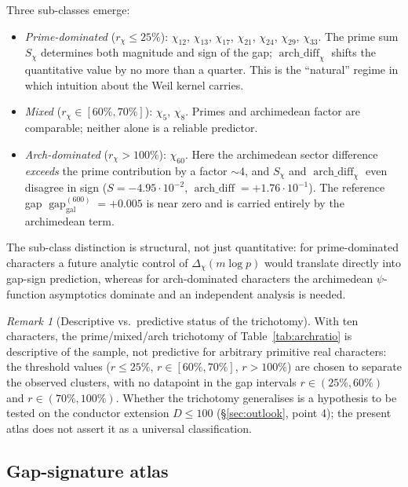 \documentclass[10pt,twocolumn]{article}
\theoremstyle{definition}
\theoremstyle{remark}
\newtheorem{remark}[theorem]{Remark}
\newcommand{\gap}{\operatorname{gap}}
\newcommand{\chifn}{\chi}
\newcommand{\Deltachi}{\Delta_{\chifn}}
\newcommand{\archdiff}{\operatorname{arch\_diff}}
\begin{document}
Three sub-classes emerge:
\begin{itemize}
  \item \emph{Prime-dominated} ($r_{\chifn}\leq 25\%$):
    $\chifn_{12}$, $\chifn_{13}$, $\chifn_{17}$, $\chifn_{21}$,
    $\chifn_{24}$, $\chifn_{29}$, $\chifn_{33}$. The prime sum
    $S_{\chifn}$ determines both magnitude and sign of the gap;
    $\archdiff_{\chifn}$ shifts the quantitative value by no more
    than a quarter. This is the ``natural'' regime in which
    intuition about the Weil kernel carries.
  \item \emph{Mixed} ($r_{\chifn}\in[60\%,70\%]$):
    $\chifn_5$, $\chifn_8$. Primes and archimedean factor are
    comparable; neither alone is a reliable predictor.
  \item \emph{Arch-dominated} ($r_{\chifn}>100\%$):
    $\chifn_{60}$. Here the archimedean sector difference
    \emph{exceeds} the prime contribution by a factor $\sim 4$, and
    $S_{\chifn}$ and $\archdiff_{\chifn}$ even disagree in sign
    ($S=-4.95\!\cdot\!10^{-2}$, $\archdiff=+1.76\!\cdot\!10^{-1}$).
    The reference gap
    $\gap_{\mathrm{gal}}^{(600)}=+0.005$ is near zero and is carried
    entirely by the archimedean term.
\end{itemize}

The sub-class distinction is structural, not just quantitative: for
prime-dominated characters a future analytic control of
$\Deltachi(m\log p)$ would translate directly into gap-sign
prediction, whereas for arch-dominated characters the archimedean
$\psi$-function asymptotics dominate and an independent analysis is
needed.

\begin{remark}[Descriptive vs.\ predictive status of the trichotomy]
\label{rem:trichotomy-descriptive}
With ten characters, the prime/mixed/arch trichotomy of
Table~\ref{tab:archratio} is descriptive of the sample, not
predictive for arbitrary primitive real characters: the threshold
values ($r\leq 25\%$, $r\in[60\%,70\%]$, $r>100\%$) are chosen to
separate the observed clusters, with no datapoint in the gap
intervals $r\in(25\%,60\%)$ and $r\in(70\%,100\%)$. Whether the
trichotomy generalises is a hypothesis to be tested on the
conductor extension $D\leq 100$ (\S\ref{sec:outlook}, point 4); the
present atlas does not assert it as a universal classification.
\end{remark}

\subsection{Gap-signature atlas}
\label{sec:gapsig}
\end{document}
